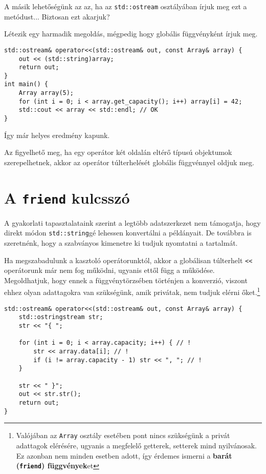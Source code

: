 \documentclass[a4paper, 11pt, oneside]{book}
\begin{document}
A másik lehetőségünk az az, ha az \verb*|std::ostream| osztályában írjuk meg ezt a metódust... Biztosan ezt akarjuk?

Létezik egy harmadik megoldás, mégpedig hogy globális függvényként írjuk meg.

\begin{lstlisting}[style=cppstyle]
std::ostream& operator<<(std::ostream& out, const Array& array) {
	out << (std::string)array;
	return out;
}
int main() {
	Array array(5);
	for (int i = 0; i < array.get_capacity(); i++) array[i] = 42;
	std::cout << array << std::endl; // OK
}
\end{lstlisting}

Így már helyes eredmény kapunk.

Az figyelhető meg, ha egy operátor két oldalán eltérő típusú objektumok szerepelhetnek, akkor az operátor túlterhelését globális függvénnyel oldjuk meg.

\section{A \texttt{friend} kulcsszó}

A gyakorlati tapasztalataink szerint a legtöbb adatszerkezet nem támogatja, hogy direkt módon \texttt{std::string}gé lehessen konvertálni a példányait. De továbbra is szeretnénk, hogy a szabványos kimenetre ki tudjuk nyomtatni a tartalmát.

Ha megszabadulunk a kasztoló operátorunktól, akkor a globálisan túlterhelt \verb*|<<| operátorunk már nem fog működni, ugyanis ettől függ a működése. Megoldhatjuk, hogy ennek a függvénytörzsében történjen a konverzió, viszont ehhez olyan adattagokra van szükségünk, amik privátak, nem tudjuk elérni őket.\footnote{Valójában az \texttt{Array} osztály esetében pont nincs szükségünk a privát adattagok elérésére, ugyanis a megfelelő getterek, setterek mind nyilvánosak. Ez azonban nem minden esetben adott, így érdemes ismerni a \textbf{barát (\texttt{friend}) függvények}et}

\begin{lstlisting}[style=cppstyle]
std::ostream& operator<<(std::ostream& out, const Array& array) {
	std::ostringstream str;
	str << "{ ";
		
	for (int i = 0; i < array.capacity; i++) { // !
		str << array.data[i]; // !
		if (i != array.capacity - 1) str << ", "; // !
	}
		
	str << " }";
	out << str.str();
	return out;
}
\end{lstlisting}
\end{document}
